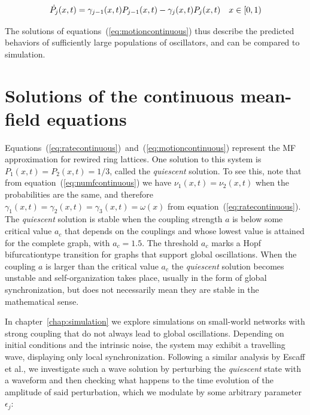 \begin{align}
  \dot{P_j}(x,t) &= \gamma_{j-1}(x,t)P_{j-1}(x,t) - \gamma_j(x,t)P_j(x,t) & x\in[0,1)
  \label{eq:motioncontinuous}
\end{align}

The solutions of equations~(\ref{eq:motioncontinuous}) thus describe the predicted behaviors of sufficiently large populations of
oscillators, and can be compared to simulation.

\section{Solutions of the continuous mean-field equations}

Equations~(\ref{eq:ratecontinuous})~and~(\ref{eq:motioncontinuous}) represent the MF approximation for rewired ring lattices. One
solution to this system is $P_1(x,t)=P_2(x,t)=1/3$, called the \textit{quiescent} solution. To see this, note that from
equation~(\ref{eq:numfcontinuous}) we have $\nu_1(x,t) = \nu_2(x,t)$ when the probabilities are the same, and therefore $\gamma_1(x,t)
= \gamma_2(x,t) = \gamma_3(x,t)=\omega(x)$ from equation~(\ref{eq:ratecontinuous}). The \textit{quiescent} solution is stable when the
coupling strength $a$ is below some critical value $a_c$ that depends on the couplings and whose lowest value is attained for the
complete graph, with $a_c=1.5$. The threshold $a_c$ marks a Hopf bifurcation\footnotemark type transition for graphs that support
global oscillations\cite{Wood06a}\cite{rodrigues2020synchronization}\cite{Wood06b}\cite{Wood07b}. When the coupling $a$ is larger than
the critical value $a_c$ the \textit{quiescent} solution becomes unstable and self-organization takes place, usually in the form of
global synchronization, but does not necessarily mean they are stable in the mathematical sense.


In chapter~\ref{chap:simulation} we explore simulations on small-world networks with strong coupling that do not always lead to global
oscillations. Depending on initial conditions and the intrinsic noise, the system may exhibit a travelling wave, displaying only local
synchronization. Following a similar analysis by Escaff et al.\cite{escaff2014arrays}, we investigate such a wave solution by
perturbing the \textit{quiescent} state with a waveform and then checking what happens to the time evolution of the amplitude of said
perturbation, which we modulate by some arbitrary parameter $\epsilon_j$:

